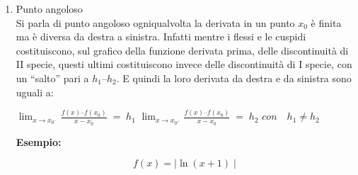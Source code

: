 \documentclass[a4paper,12pt]{report}
\begin{document}
\begin{enumerate}
\begin{center}
\begin{equation}
	 f(x) = 
      \begin{cases}
        2 - \sqrt{-x^2 -4x} & \text{se}\;\;-3 \leq x < 0\\
        2 - \sqrt{-x^2 +4x} & \text{se}\; \quad 0 \leq x \leq 3
      \end{cases}\,.
\end{equation}
\end{center}
\newpage
\begin{figure}[ht]
\begin{center}
	\caption{Cuspide a vertice rivolto verso l'alto in $x_{0} = 0$}
\end{center}
\end{figure}

\item {Punto angoloso} \\
Si parla di punto angoloso ogniqualvolta la derivata in un punto $x_{0}$ è finita ma è diversa da destra a sinistra.
Infatti mentre i flessi e le cuspidi costituiscono, sul grafico della funzione derivata prima, delle discontinuità di II specie, questi ultimi costituiscono invece delle discontinuità di I specie, con un “salto” pari a $h_{1} – h_{2}$.
E quindi la loro derivata da destra e da sinistra sono uguali a: \\
\begin{center}
$\lim_{x\to x_{0^-}}\frac{f(x) – f(x_{0})}{x-x_{0}} \;=\; h_{1}$ \qquad
$\lim_{x\to x_{0^+}}\frac{f(x) – f(x_{0})}{x-x_{0}} \;=\; h_{2}$ \qquad
$con \quad h_{1} \neq h_{2}$
\end{center}
\medskip
\textbf{Esempio:} \\
\newpage
\begin{center}
\begin{equation}
	 f(x) = \mid \ln(x+1) \mid 
\end{equation}
\end{center}


\end{enumerate}
\end{document}
